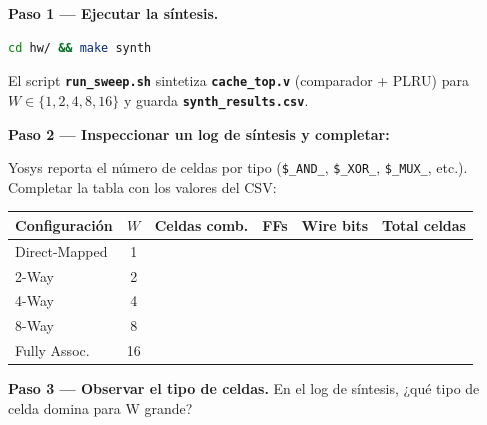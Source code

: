 \documentclass[12pt, a4paper]{article}
\newcommand{\archivo}[1]{\texttt{\textbf{#1}}}
\begin{document}
\begin{ejercicio}
    \textbf{Paso 1 — Ejecutar la síntesis.}
\begin{lstlisting}[language=bash, numbers=none]
cd hw/ && make synth
\end{lstlisting}
    El script \archivo{run\_sweep.sh} sintetiza \archivo{cache\_top.v} (comparador
    + PLRU) para $W \in \{1, 2, 4, 8, 16\}$ y guarda \archivo{synth\_results.csv}.

    \textbf{Paso 2 — Inspeccionar un log de síntesis y completar:}

    Yosys reporta el número de celdas por tipo (\texttt{\$\_AND\_},
    \texttt{\$\_XOR\_}, \texttt{\$\_MUX\_}, etc.).
    Completar la tabla con los valores del CSV:

    \begin{center}
    \renewcommand{\arraystretch}{1.9}
    \begin{tabular}{|l|c|c|c|c|c|}
        \hline
        \textbf{Configuración} & $W$ & \textbf{Celdas comb.} &
        \textbf{FFs} & \textbf{Wire bits} & \textbf{Total celdas} \\
        \hline
        Direct-Mapped & 1  & & & & \\
        \hline
        2-Way         & 2  & & & & \\
        \hline
        4-Way         & 4  & & & & \\
        \hline
        8-Way         & 8  & & & & \\
        \hline
        Fully Assoc.  & 16 & & & & \\
        \hline
    \end{tabular}
    \end{center}

    \textbf{Paso 3 — Observar el tipo de celdas.}
    En el log de síntesis, ¿qué tipo de celda domina para W grande?
    
\end{ejercicio}
\end{document}
